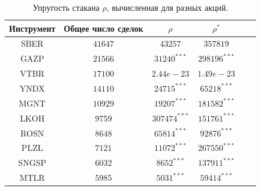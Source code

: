 \begin{table}[h!]
    \begin{center}
        \begin{tabular}{|c|c|c|c|c|c|}
            \hline
        Инструмент        & Общее число сделок & $\rho$ & $\rho ^*$ \\ \hline
        SBER &  $41647$  & $ 43257    $ & $ 357819     $ \\ \hline
        GAZP &  $21566$  & $ 31240^{***}    $ & $ 298196^{***}     $ \\ \hline
        VTBR &  $17100$  & $ 2.44e-23 $ & $ 1.49e-23 $  \\ \hline
        YNDX &  $14110$  & $ 24715^{***}    $ & $ 65218^{***}     $ \\ \hline
        MGNT &  $10929$  & $ 19207^{***}    $ & $ 181582^{***}    $  \\ \hline
        LKOH &  $9759 $ &  $307474^{***}    $ & $ 151761^{***}    $  \\ \hline
        ROSN &  $8648 $ &  $65814^{***}     $ & $ 92876^{***}     $ \\ \hline
        PLZL &  $7121 $ &  $11072^{***}     $ & $ 267550^{***}    $  \\ \hline
        SNGSP & $ 6032$  & $ 8652^{***}     $ & $ 137911^{***}    $  \\ \hline
        MTLR &  $5985 $ &  $5031^{***}      $ & $ 59414^{***}     $ \\ \hline
        \end{tabular}
    \end{center}
    \label{tableanal}
    \caption{Упругость стакана $\rho$, вычисленная для разных акций.}
\end{table} 


